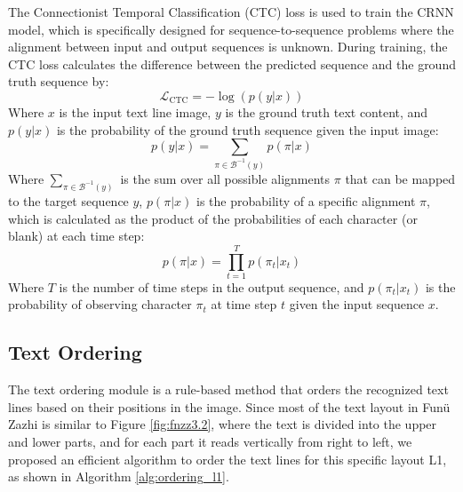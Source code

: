 \documentclass[12pt,twoside]{report}
\begin{document}
The Connectionist Temporal Classification (CTC) loss \cite{ctcloss} is used to train the CRNN model, which is specifically designed for sequence-to-sequence problems where the alignment between input and output sequences is unknown. During training, the CTC loss calculates the difference between the predicted sequence and the ground truth sequence by:
\begin{equation}
    \mathcal{L}_{\text{CTC}} = -\log (p(y | x))
\end{equation}
Where $x$ is the input text line image, $y$ is the ground truth text content, and $p(y | x)$ is the probability of the ground truth sequence given the input image:
\begin{equation}
    p(y | x) = \sum_{\pi \in \mathcal{B}^{-1}(y)} p(\pi | x)
\end{equation}
Where $\sum_{\pi \in \mathcal{B}^{-1}(y)}$ is the sum over all possible alignments $\pi$ that can be mapped to the target sequence $y$, $p(\pi | x)$ is the probability of a specific alignment $\pi$, which is calculated as the product of the probabilities of each character (or blank) at each time step:
\begin{equation}
    p(\pi | x) = \prod_{t=1}^{T} p(\pi_t | x_t)
\end{equation}
Where $T$ is the number of time steps in the output sequence, and $p(\pi_t | x_t)$ is the probability of observing character $\pi_t$ at time step $t$ given the input sequence $x$.

\subsection{Text Ordering}
\label{sec:text_ordering}
The text ordering module is a rule-based method that orders the recognized text lines based on their positions in the image. Since most of the text layout in Funü Zazhi is similar to Figure \ref{fig:fnzz3.2}, where the text is divided into the upper and lower parts, and for each part it reads vertically from right to left, we proposed an efficient algorithm to order the text lines for this specific layout L1, as shown in Algorithm \ref{alg:ordering_l1}.
\end{document}
